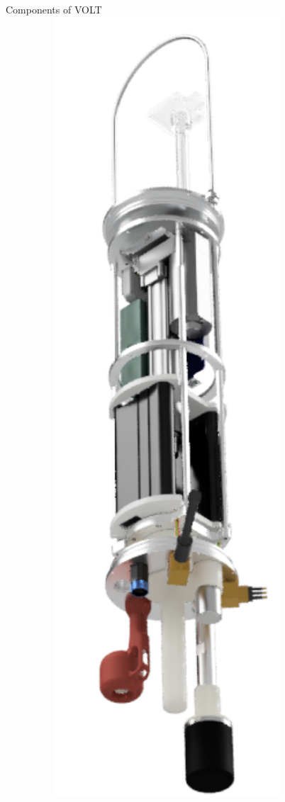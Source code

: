 \begin{frame}{Components of VOLT}
     \includegraphics[height=0.9\textheight,width=0.9\textwidth,keepaspectratio]{images/VOLT/volt-rendered.png}
\end{frame}

